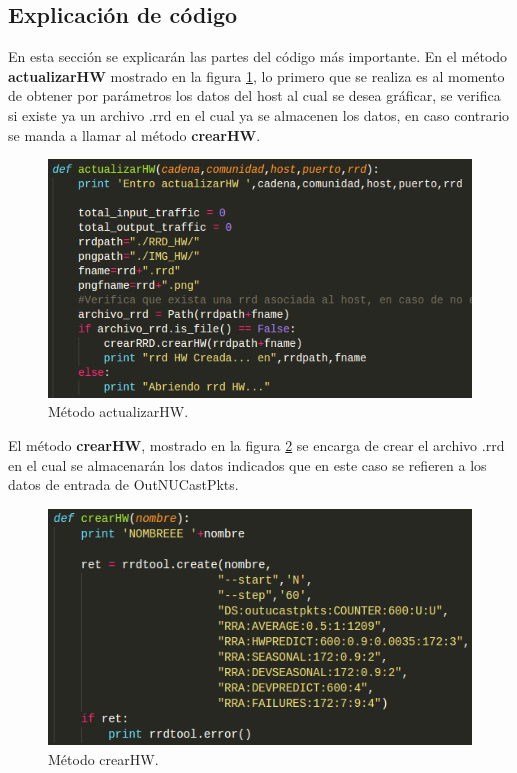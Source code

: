 \subsection{Explicación de código}
En esta sección se explicarán las partes del código más importante. En el método \textbf{actualizarHW} mostrado en la figura \ref{image:codigo4}, lo primero que se realiza es al momento de obtener por parámetros los datos del host al cual se desea gráficar, se verifica si existe ya un archivo .rrd en el cual ya se almacenen los datos, en caso contrario se manda a llamar al método \textbf{crearHW}.
\FloatBarrier
\begin{figure}[htbp!]
		\centering
			\includegraphics[width=.7 \textwidth]{images/codigo4}
		\caption{Método actualizarHW.}
		\label{image:codigo4}
\end{figure}
\FloatBarrier


El método \textbf{crearHW}, mostrado en la figura \ref{image:codigo1} se encarga de crear el archivo .rrd en el cual se almacenarán los datos indicados que en este caso se refieren a los datos de entrada de OutNUCastPkts.
\FloatBarrier
\begin{figure}[htbp!]
		\centering
			\includegraphics[width=.7 \textwidth]{images/codigo1}
		\caption{Método crearHW.}
		\label{image:codigo1}
\end{figure}
\FloatBarrier

